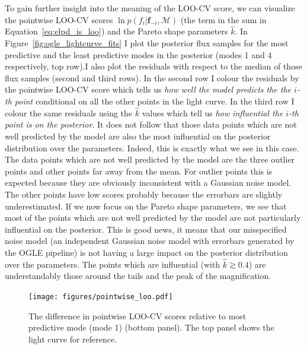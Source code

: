 \documentclass[12pt,dvipsnames]{report}
\renewcommand{\vec}[1]{\boldsymbol{\mathbf{#1}}}
\begin{document}
To gain further insight into the meaning of the LOO-CV score, we can visualize the 
pointwise LOO-CV scores $\ln p\left(f_{i} \lvert \vec f_{-i},\mathcal{M}\right)$ 
(the term in the sum in Equation~\ref{eq:elpd_is_loo}) and the Pareto shape parameters
$\hat k$.
In Figure~\ref{fig:ogle_lightcurve_fits} I plot the posterior flux samples for the most 
predictive and the least predictive modes in the posterior (modes 1 and 4 respectively,
top row).I also plot the residuals with respect to the median of those 
flux samples (second and third rows). In the second row I colour the residuals by the 
pointwise LOO-CV score which tells us 
\emph{how well the model predicts the the $i$-th point} conditional on all the other 
points in the light curve. In the third row I colour the same residuals using the
$\hat k$ values which tell us \emph{how influential the $i$-th point is on 
the posterior}. It does not follow that those data points which are not well predicted 
by the model are also the most influential on the posterior distribution over the 
parameters. Indeed, this is exactly what we see in this case. The data points which 
are not well predicted by the model are the three outlier points and other points 
far away from the mean. For outlier points this is expected
because they are obviously inconsistent with a Gaussian noise model. The other points 
have low scores probably because the errorbars are slightly underestimated. 
If we now focus on the Pareto shape parameters, we see that most of the points 
which are not well predicted by the model are not particularly influential on the 
posterior. This is good news, it means that our misspecified noise model 
(an independent Gaussian noise model with errorbars generated by the OGLE pipeline)
is not having a large impact on the posterior distribution over the parameters.
The points which are influential (with $\hat k\gtrsim 0.4$) are understandably those 
around the tails and the peak of the magnification. 

\begin{figure}[t]
    \begin{centering}
        \texttt{[image: figures/pointwise\_loo.pdf]}
        \caption{The difference in pointwise LOO-CV scores relative to most predictive 
        mode (mode 1) (bottom panel). The top panel shows the light curve for reference.}
            \label{fig:pointwise_loo}
    \end{centering}
\end{figure}
\end{document}
